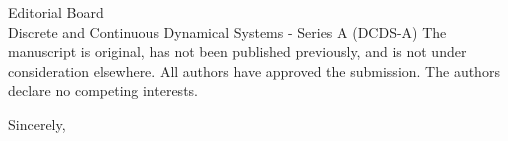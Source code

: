 \documentclass[11pt]{letter}
\begin{document}
\begin{letter}{Editorial Board\\Discrete and Continuous Dynamical Systems - Series A (DCDS-A)}
The manuscript is original, has not been published previously, and is not under consideration elsewhere. All authors have approved the submission. The authors declare no competing interests.

\closing{Sincerely,}

\end{letter}
\end{document}

